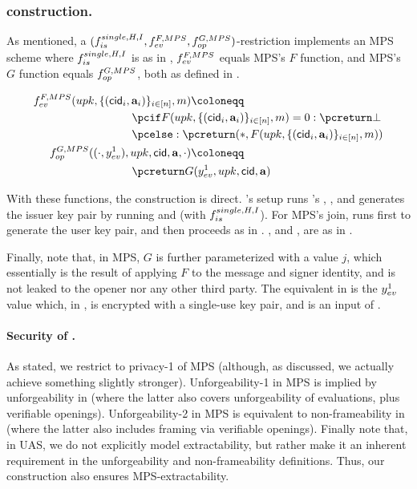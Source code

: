 \subsubsection{\CUASMPS construction.} %
As mentioned, a $(f_{is}^{single,H,I},f_{ev}^{F,MPS},
f_{op}^{G,MPS})$-restriction implements an MPS scheme where
$f_{is}^{single,H,I}$ is as in , $f_{ev}^{F,MPS}$
equals MPS's $F$ function, and MPS's $G$ function equals $f_{op}^{G,MPS}$, both
as defined in .

\begin{align}
  \feval^{F,MPS}(\upk,\lbrace (\cid_i,\attrs_i) \rbrace_{i\in[n]},\msg)
  \coloneqq & \nonumber \\
  & \hspace*{-10em} \pcif F(\upk,\lbrace (\cid_i,\attrs_i) \rbrace_{i\in[n]},
    \msg) = 0: \pcreturn \bot \nonumber \\
  & \hspace*{-10em} \pcelse: \pcreturn (\ast,F(\upk,\lbrace(\cid_i,\attrs_i)
    \rbrace_{i\in[n]},\msg)) \nonumber \\
  \finsp^{G,MPS}((\cdot,\yeval^1),\upk,\cid,\attrs,\cdot) \coloneqq
  & \nonumber \\
  & \hspace*{-10em} \pcreturn G(\yeval^1,\upk,\cid,\attrs)
    \label{eq:funcs-mps}
\end{align}

With these functions, the construction is direct. \CUASMPS's setup runs
\CUASGen's \Setup, \OKeyGen, and generates the issuer key pair by running
\KeyGen and \ISet (with $f_{is}^{single,H,I}$). For MPS's join, \CUASMPS runs
first \KeyGen to generate the user key pair, and then proceeds as in \CUASGen.
\Sign, \Verify and \Open, are as in \CUASGen.

Finally, note that, in MPS, $G$ is further parameterized with a value $j$, which
essentially is the result of applying $F$ to the message and signer identity,
and is not leaked to the opener nor any other third party. The equivalent in
\UAS is the $y_{ev}^1$ value which, in \CUASGen, is encrypted with a single-use
key pair, and is an input of \finsp.

\paragraph{Security of \CUASMPS.} %
As stated, we restrict to privacy-1 of MPS (although, as
discussed, we actually achieve something slightly stronger). Unforgeability-1 in
MPS is implied by unforgeability in \UAS (where the latter also covers
unforgeability of \fissue evaluations, plus verifiable openings).
Unforgeability-2 in MPS is equivalent to non-frameability in \UAS (where the
latter also includes framing via verifiable openings). Finally note that, in
UAS, we do not explicitly model extractability, but rather make it an inherent
requirement in the unforgeability and non-frameability definitions. Thus, our
\CUASMPS construction also ensures MPS-extractability.

